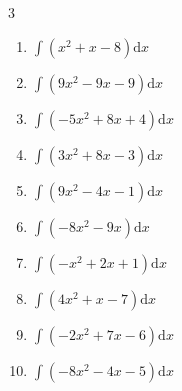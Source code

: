 \begin{multicols}{3}
\begin{enumerate}

\columnbreak %

\resetques

  \item $\displaystyle \int \left( x^{2}+x-8 \right) \mathrm{d}x$


  \item $\displaystyle \int \left( 9x^{2}-9x-9 \right) \mathrm{d}x$


  \item $\displaystyle \int \left( -5x^{2}+8x+4 \right) \mathrm{d}x$


  \item $\displaystyle \int \left( 3x^{2}+8x-3 \right) \mathrm{d}x$


  \item $\displaystyle \int \left( 9x^{2}-4x-1 \right) \mathrm{d}x$


  \item $\displaystyle \int \left( -8x^{2}-9x \right) \mathrm{d}x$


  \item $\displaystyle \int \left( -x^{2}+2x+1 \right) \mathrm{d}x$


  \item $\displaystyle \int \left( 4x^{2}+x-7 \right) \mathrm{d}x$


  \item $\displaystyle \int \left( -2x^{2}+7x-6 \right) \mathrm{d}x$


  \item $\displaystyle \int \left( -8x^{2}-4x-5 \right) \mathrm{d}x$


\end{enumerate}
\end{multicols}
